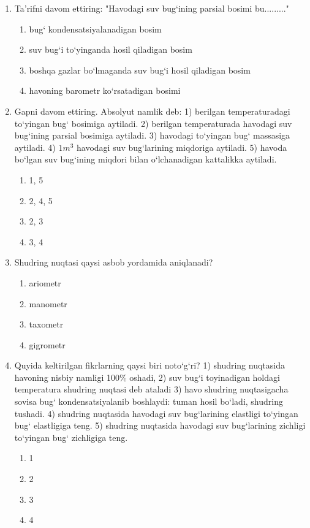 \begin{enumerate}

\item Ta’rifni davom ettiring: "Havodagi suv bug‘ining parsial bosimi bu........."
\begin{enumerate}[label=\Alph*)]
\item bug‘ kondensatsiyalanadigan bosim
\item suv bug‘i to‘yinganda hosil qiladigan bosim
\item boshqa gazlar bo‘lmaganda suv bug‘i hosil qiladigan bosim
\item havoning barometr ko‘rsatadigan bosimi
\end{enumerate}

\item Gapni davom ettiring. Absolyut namlik deb:
1) berilgan temperaturadagi to‘yingan bug‘ bosimiga aytiladi.
2) berilgan temperaturada havodagi suv bug‘ining parsial bosimiga aytiladi.
3) havodagi to‘yingan bug‘ massasiga aytiladi.
4) $1 m^3$ havodagi suv bug‘larining miqdoriga aytiladi.
5) havoda bo‘lgan suv bug‘ining miqdori bilan o‘lchanadigan kattalikka aytiladi.
\begin{enumerate}[label=\Alph*)]
\item 1, 5
\item 2, 4, 5
\item 2, 3
\item 3, 4
\end{enumerate}

\item Shudring nuqtasi qaysi asbob yordamida aniqlanadi?
\begin{enumerate}[label=\Alph*)]
\item ariometr
\item manometr
\item taxometr
\item gigrometr
\end{enumerate}

\item Quyida keltirilgan fikrlarning qaysi biri noto‘g‘ri?
1) shudring nuqtasida havoning nisbiy namligi 100\% oshadi,
2) suv bug‘i toyinadigan holdagi temperatura shudring nuqtasi deb ataladi
3) havo shudring nuqtasigacha sovisa bug‘ kondensatsiyalanib boshlaydi: tuman hosil bo‘ladi, shudring tushadi.
4) shudring nuqtasida havodagi suv bug‘larining elastligi to‘yingan bug‘ elastligiga teng.
5) shudring nuqtasida havodagi suv bug‘larining zichligi to‘yingan bug‘ zichligiga teng.
\begin{enumerate}[label=\Alph*)]
\item 1
\item 2
\item 3
\item 4
\end{enumerate}


\end{enumerate}
